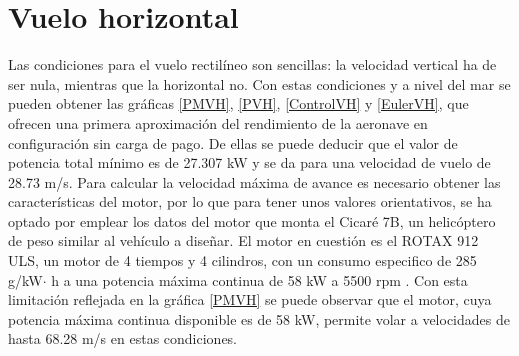 \chapter{Vuelo horizontal}

Las condiciones para el vuelo rectilíneo son sencillas: la velocidad vertical ha de ser nula, mientras que la horizontal no. Con estas condiciones y a nivel del mar se pueden obtener las gráficas \ref{PMVH}, \ref{PVH}, \ref{ControlVH} y \ref{EulerVH}, que ofrecen una primera aproximación del rendimiento de la aeronave en configuración sin carga de pago. De ellas se puede deducir que el valor de potencia total mínimo es de 27.307 kW y se da para una velocidad de vuelo de 28.73 m/s. Para calcular la velocidad máxima de avance es necesario obtener las características del motor, por lo que para tener unos valores orientativos, se ha optado por emplear los datos del motor que monta el Cicaré 7B, un helicóptero de peso similar al vehículo a diseñar. El motor en cuestión es el ROTAX 912 ULS, un motor de 4 tiempos y 4 cilindros, con un consumo especifico de 285 g/kW$\cdot$ h a una potencia máxima continua de 58 kW a 5500 rpm \citep{ROTAX}. Con esta limitación reflejada en la gráfica \ref{PMVH} se puede observar que el motor, cuya potencia máxima continua disponible es de 58 kW, permite volar a velocidades de hasta 68.28 m/s en estas condiciones.

